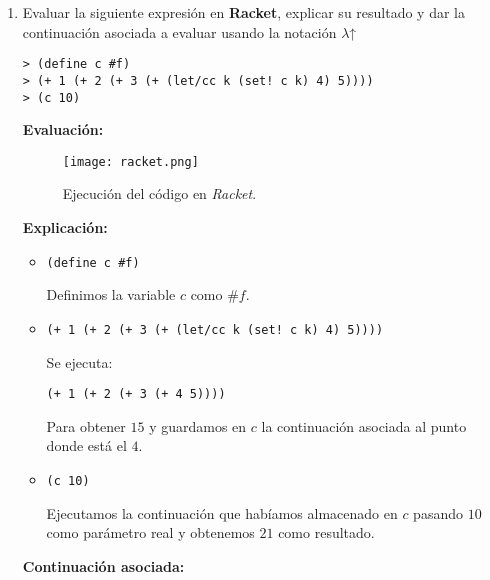 \documentclass[12pt,letterpaper]{article}
\begin{document}
\begin{enumerate}
\begin{itemize}
\begin{verbatim}
        (+5 (+4 (+3 (+2 (+1 0)))))
        15
         \end{verbatim}

            El resultado final de la ejecución es 15 ya que gracias al usar el combinador de punto fijo Y podemos hacer auto-referencia a la función completa de sum y así evitar los problemas de variables libres que se podrían presentar, como en la ejecución anterior. \\
         
        
    \end{itemize}
    \item Evaluar la siguiente expresión en \textbf{Racket}, explicar su resultado y dar la continuación asociada a evaluar usando la notación $\lambda$↑
\begin{verbatim}
> (define c #f)
> (+ 1 (+ 2 (+ 3 (+ (let/cc k (set! c k) 4) 5))))
> (c 10)
\end{verbatim}
    \textbf{Evaluación:}
    \begin{figure}[H]
        \centering
        \texttt{[image: racket.png]}
        \caption{Ejecución del código en \textit{Racket}.}
        \label{fig:enter-label}
    \end{figure}
    \textbf{Explicación:}
    \begin{itemize}
        \item
            \begin{verbatim}
(define c #f)
            \end{verbatim}
        Definimos la variable $c$ como $\#f$.
        \item 
            \begin{verbatim}
(+ 1 (+ 2 (+ 3 (+ (let/cc k (set! c k) 4) 5))))
            \end{verbatim}
        Se ejecuta:
        \begin{verbatim}
(+ 1 (+ 2 (+ 3 (+ 4 5))))
        \end{verbatim}
        Para obtener $15$ y guardamos en $c$ la continuación asociada al punto donde está el $4$.
        \item 
            \begin{verbatim}
(c 10)
            \end{verbatim}
        Ejecutamos la continuación que habíamos almacenado en $c$ pasando $10$ como parámetro real y obtenemos $21$ como resultado.
    \end{itemize}
    \textbf{Continuación asociada:}
    \\ \\

\end{enumerate}
\end{document}
